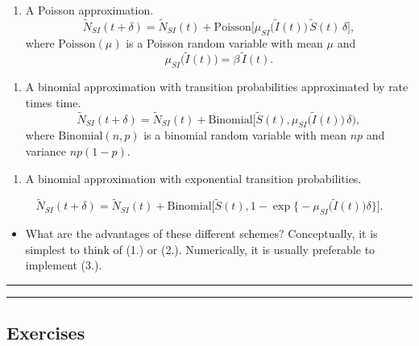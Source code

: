 \documentclass[]{article}
\providecommand{\tightlist}{%
  \setlength{\itemsep}{0pt}\setlength{\parskip}{0pt}}
\begin{document}
\begin{enumerate}
\def\labelenumi{\arabic{enumi}.}
\tightlist
\item
  A Poisson approximation.
  \[\tilde N_{SI}(t+\delta)= \tilde N_{SI}(t) + \mathrm{Poisson}\big[\mu_{SI}\big(\tilde I(t)\big) \, \tilde S(t) \,\delta\big],\]
  where \(\mathrm{Poisson}(\mu)\) is a Poisson random variable with mean
  \(\mu\) and \[\mu_{SI}\big(\tilde I(t)\big) = \beta\, \tilde I(t).\]
\end{enumerate}

\begin{enumerate}
\def\labelenumi{\arabic{enumi}.}
\setcounter{enumi}{1}
\tightlist
\item
  A binomial approximation with transition probabilities approximated by
  rate times time.
  \[\tilde N_{SI}(t+\delta) = \tilde N_{SI}(t) + \mathrm{Binomial}\big[\tilde S(t),\mu_{SI}\big(\tilde I(t)\big) \, \delta\big),\]
  where \(\mathrm{Binomial}(n,p)\) is a binomial random variable with
  mean \(np\) and variance \(np(1-p)\).
\end{enumerate}

\begin{enumerate}
\def\labelenumi{\arabic{enumi}.}
\setcounter{enumi}{2}
\tightlist
\item
  A binomial approximation with exponential transition probabilities.
\end{enumerate}

\[ \tilde N_{SI}(t+\delta)= \tilde N_{SI}(t) + \mathrm{Binomial}\big[\tilde S(t),1-\exp\big\{-\mu_{SI}\big(\tilde I(t)\big) \delta\big\}\big].\]

\begin{itemize}
\tightlist
\item
  What are the advantages of these different schemes? Conceptually, it
  is simplest to think of (1.) or (2.). Numerically, it is usually
  preferable to implement (3.).
\end{itemize}

\begin{center}\rule{0.5\linewidth}{\linethickness}\end{center}

\begin{center}\rule{0.5\linewidth}{\linethickness}\end{center}

\subsection{Exercises}\label{exercises-1}
\end{document}
